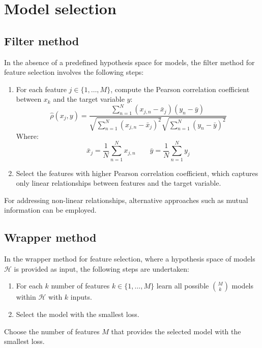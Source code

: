 \section{Model selection}

\subsection{Filter method}
In the absence of a predefined hypothesis space for models, the filter method for feature selection involves the following steps: 
\begin{enumerate}
    \item For each feature $j \in \{1,\ldots,M\}$, compute the Pearson correlation coefficient between $x_k$ and the target variable $y$:
        \[\hat{\rho}(x_j,y)=\dfrac{\sum_{n=1}^N(x_{j,n}-\bar{x}_j)(y_n-\bar{y})}{\sqrt{\sum_{n=1}^N(x_{j,n}-\bar{x}_j)^2}\sqrt{\sum_{n=1}^N(y_n-\bar{y})^2}}\]
        Where: 
        \[\bar{x}_j=\dfrac{1}{N}\sum_{n=1}^Nx_{j,n} \qquad \bar{y}=\dfrac{1}{N}\sum_{n=1}^Ny_{j}\]
    \item Select the features with higher Pearson correlation coefficient, which captures only linear relationships between features and the target variable.
\end{enumerate}
For addressing non-linear relationships, alternative approaches such as mutual information can be employed.

\subsection{Wrapper method}
In the wrapper method for feature selection, where a hypothesis space of models  $\mathcal{H}$ is provided as input, the following steps are undertaken: 
\begin{enumerate}
    \item For each $k$ number of features $k \in \{1,\ldots,M\}$ learn all possible $\binom{M}{k}$ models within $\mathcal{H}$ with $k$ inputs. 
    \item Select the model with the smallest loss.
\end{enumerate}
Choose the number of features $M$ that provides the selected model with the smallest loss.


